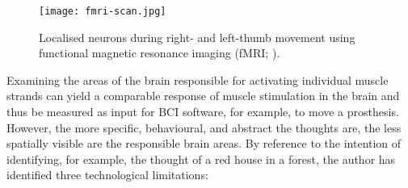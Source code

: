 \begin{figure}[ht]
  \centering
  \texttt{[image: fmri-scan.jpg]}
  \caption[Localised neurons during right- and left- thumb movement using functional magnetic resonance imaging (fMRI)]{Localised neurons during right- and left-thumb movement using functional magnetic resonance imaging (fMRI; \cite{rashid_bilateral_2018}).}
  \label{fig:fmri-scan}
\end{figure}

Examining the areas of the brain responsible for activating individual muscle strands can yield a comparable response of muscle stimulation in the brain and thus be measured as input for BCI software, for example, to move a prosthesis. However, the more specific, behavioural, and abstract the thoughts are, the less spatially visible are the responsible brain areas. By reference to the intention of identifying, for example, the thought of a red house in a forest, the author has identified three technological limitations:

